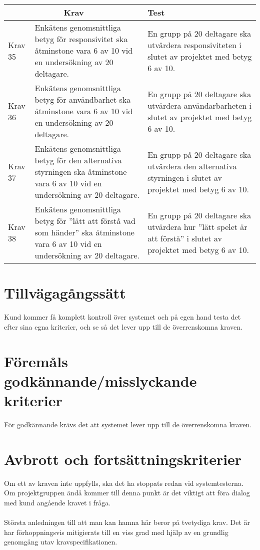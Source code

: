 \documentclass[10pt]{article}
\begin{document}
	\begin{tabular}{| p{1.5cm} | p{6cm} | p{8cm}|}
	
  \hline
    \multicolumn{2}{|c|}{Krav}&{Test}\\
    \hline


		Krav 35& Enkätens\cite {bib-kvalitetsplan} genomsnittliga betyg för responsivitet ska åtminstone vara 6 av 10 vid en undersökning av 20 deltagare. & En grupp på 20 deltagare ska utvärdera responsiviteten i slutet av projektet med betyg 6 av 10. \\
		\hline
		Krav 36& Enkätens\cite {bib-kvalitetsplan} genomsnittliga betyg för användbarhet ska åtminstone vara 6 av 10 vid en undersökning av 20 deltagare. & En grupp på 20 deltagare ska utvärdera användarbarheten i slutet av projektet med betyg 6 av 10. \\
		\hline
		Krav 37& Enkätens\cite {bib-kvalitetsplan} genomsnittliga betyg för den alternativa styrningen ska åtminstone vara 6 av 10 vid en undersökning av 20 deltagare. & En grupp på 20 deltagare ska utvärdera den alternativa styrningen i slutet av projektet med betyg 6 av 10. \\
		\hline
		Krav 38&Enkätens\cite{bib-kvalitetsplan} genomsnittliga betyg för ''lätt att förstå vad som händer'' ska åtminstone vara 6 av 10 vid en undersökning av 20 deltagare. & En grupp på 20 deltagare ska utvärdera hur ''lätt spelet är att förstå'' i slutet av projektet med betyg 6 av 10. \\
		\hline

   
  \end{tabular}
  


\section{Tillvägagångssätt}
	Kund kommer få komplett kontroll över systemet och på egen hand testa det efter sina egna kriterier, och se så det lever upp till de överrenskomna kraven. \\
	
	

\section{Föremåls godkännande/misslyckande kriterier}
	För godkännande krävs det att systemet lever upp till de överrenskomna kraven.


\section{Avbrott och fortsättningskriterier}
	Om ett av kraven inte uppfylls, ska det ha stoppats redan vid systemtesterna. Om projektgruppen ändå kommer till denna punkt är det viktigt att föra dialog med kund angående kravet i fråga.\\
	\\
	Största anledningen till att man kan hamna här beror på tvetydiga krav. Det är har förhoppningsvis mitigierats till en viss grad med hjälp av en grundlig genomgång utav kravspecifikationen.
\end{document}
